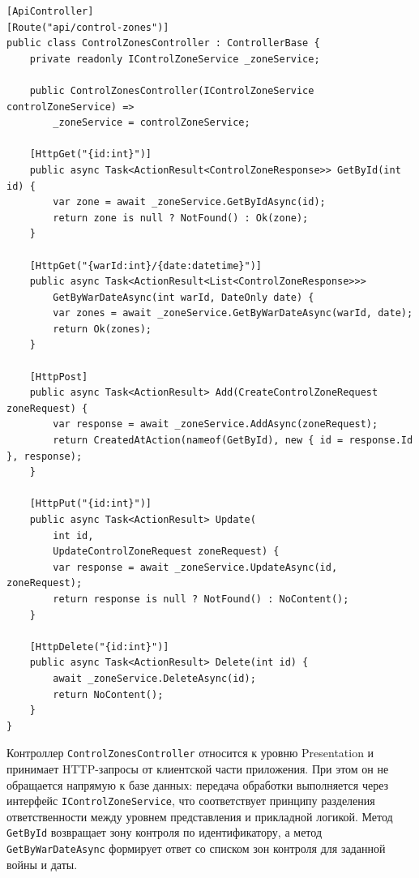 \begin{code}
\label{code:control-zones-controller-api}
\vspace{-0.75cm}
\begin{verbatim}
[ApiController]
[Route("api/control-zones")]
public class ControlZonesController : ControllerBase {
    private readonly IControlZoneService _zoneService;

    public ControlZonesController(IControlZoneService controlZoneService) =>
        _zoneService = controlZoneService;

    [HttpGet("{id:int}")]
    public async Task<ActionResult<ControlZoneResponse>> GetById(int id) {
        var zone = await _zoneService.GetByIdAsync(id);
        return zone is null ? NotFound() : Ok(zone);
    }

    [HttpGet("{warId:int}/{date:datetime}")]
    public async Task<ActionResult<List<ControlZoneResponse>>>
        GetByWarDateAsync(int warId, DateOnly date) {
        var zones = await _zoneService.GetByWarDateAsync(warId, date);
        return Ok(zones);
    }

    [HttpPost]
    public async Task<ActionResult> Add(CreateControlZoneRequest zoneRequest) {
        var response = await _zoneService.AddAsync(zoneRequest);
        return CreatedAtAction(nameof(GetById), new { id = response.Id }, response);
    }

    [HttpPut("{id:int}")]
    public async Task<ActionResult> Update(
        int id,
        UpdateControlZoneRequest zoneRequest) {
        var response = await _zoneService.UpdateAsync(id, zoneRequest);
        return response is null ? NotFound() : NoContent();
    }

    [HttpDelete("{id:int}")]
    public async Task<ActionResult> Delete(int id) {
        await _zoneService.DeleteAsync(id);
        return NoContent();
    }
}
\end{verbatim}
\end{code}

Контроллер \texttt{ControlZonesController} относится к уровню Presentation и принимает HTTP-запросы от клиентской части приложения. При этом он не обращается напрямую к базе данных: передача обработки выполняется через интерфейс \texttt{IControlZoneService}, что соответствует принципу разделения ответственности между уровнем представления и прикладной логикой. Метод \texttt{GetById} возвращает зону контроля по идентификатору, а метод \texttt{GetByWarDateAsync} формирует ответ со списком зон контроля для заданной войны и даты.

